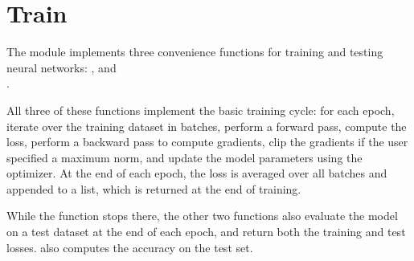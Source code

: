 \section{Train}

The  module implements three convenience functions for training and testing neural networks: ,  and\\.

All three of these functions implement the basic training cycle: for each epoch, iterate over the training dataset in batches, perform a forward pass, compute the loss, perform a backward pass to compute gradients, clip the gradients if the user specified a maximum norm, and update the model parameters using the optimizer. At the end of each epoch, the loss is averaged over all batches and appended to a list, which is returned at the end of training.

While the  function stops there, the other two functions also evaluate the model on a test dataset at the end of each epoch, and return both the training and test losses.  also computes the accuracy on the test set.


